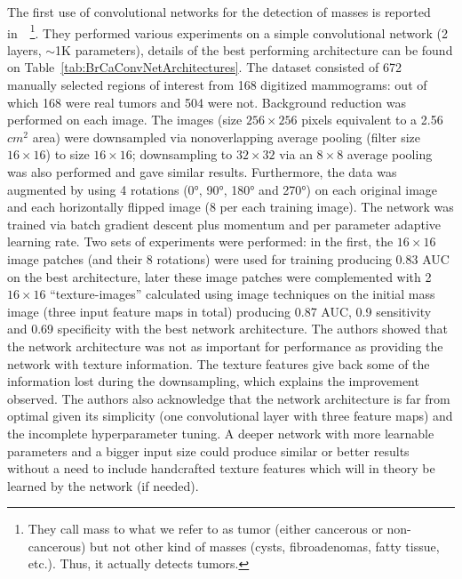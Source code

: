 The first use of convolutional networks for the detection of masses is reported in~\cite{Sahiner1996}~\footnote{They call mass to what we refer to as tumor (either cancerous or non-cancerous) but not other kind of masses (cysts, fibroadenomas, fatty tissue, etc.). Thus, it actually detects tumors.}. They performed various experiments on a simple convolutional network (2 layers, $\sim$1K parameters), details of the best performing architecture can be found on Table~\ref{tab:BrCaConvNetArchitectures}. The dataset consisted of 672 manually selected regions of interest from 168 digitized mammograms: out of which 168 were real tumors and 504 were not. Background reduction was performed on each image. The images (size $256 \times 256$ pixels equivalent to a 2.56 $cm^2$ area) were downsampled via nonoverlapping average pooling (filter size $16 \times 16$) to size $16\times 16$; downsampling to $32 \times 32$ via an $8 \times 8$ average pooling was also performed and gave similar results. Furthermore, the data was augmented by using 4 rotations (0°, 90°, 180° and 270°) on each original image and each horizontally flipped image (8 per each training image). The network was trained via batch gradient descent plus momentum and per parameter adaptive learning rate. Two sets of experiments were performed: in the first, the $16 \times 16$ image patches (and their 8 rotations) were used for training producing 0.83 AUC on the best architecture, later these image patches were complemented with 2 $16 \times 16$ ``texture-images'' calculated using image techniques on the initial mass image (three input feature maps in total) producing 0.87 AUC, 0.9 sensitivity and 0.69 specificity with the best network architecture. The authors showed that the network architecture was not as important for performance as providing the network with texture information. The texture features give back some of the information lost during the downsampling, which explains the improvement observed. The authors also acknowledge that the network architecture is far from optimal given its simplicity (one convolutional layer with three feature maps) and the incomplete hyperparameter tuning. A deeper network with more learnable parameters and a bigger input size could produce similar or better results without a need to include handcrafted texture features which will in theory be learned by the network (if needed).




